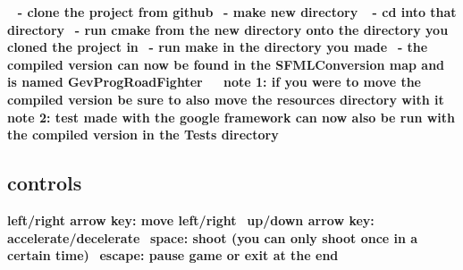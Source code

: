 ~\newline
 {\bfseries -\/ clone the project from github}~\newline
 {\bfseries -\/ make new directory }~\newline
 {\bfseries -\/ cd into that directory}~\newline
 {\bfseries -\/ run cmake from the new directory onto the directory you cloned the project in}~\newline
 {\bfseries -\/ run make in the directory you made}~\newline
 {\bfseries -\/ the compiled version can now be found in the S\+F\+M\+L\+Conversion map and is named Gev\+Prog\+Road\+Fighter}~\newline
 ~\newline
 {\bfseries  note 1\+: if you were to move the compiled version be sure to also move the resources directory with it}~\newline
 {\bfseries  note 2\+: test made with the google framework can now also be run with the compiled version in the Tests directory}~\newline


\subsection*{controls}

{\bfseries left/right arrow key\+: move left/right}~\newline
 {\bfseries up/down arrow key\+: accelerate/decelerate}~\newline
 {\bfseries space\+: shoot (you can only shoot once in a certain time)}~\newline
 {\bfseries escape\+: pause game or exit at the end}~\newline
 